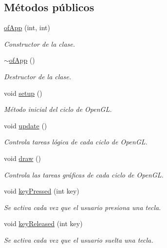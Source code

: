 \subsection*{Métodos públicos}
\begin{DoxyCompactItemize}
\item 
\hyperlink{classof_app_a8e51b68c569cf4839163fd7470d50260}{of\+App} (int, int)
\begin{DoxyCompactList}\small\item\em Constructor de la clase. \end{DoxyCompactList}\item 
\hyperlink{classof_app_a46d5e370034c47f5fc1a530bcb331c27}{$\sim$of\+App} ()
\begin{DoxyCompactList}\small\item\em Destructor de la clase. \end{DoxyCompactList}\item 
void \hyperlink{classof_app_af68eaa1366244f7a541cd08e02199c12}{setup} ()
\begin{DoxyCompactList}\small\item\em Método inicial del ciclo de Open\+G\+L. \end{DoxyCompactList}\item 
void \hyperlink{classof_app_afef41ea4aee5a22ea530afba33ae7a7b}{update} ()
\begin{DoxyCompactList}\small\item\em Controla tareas lógica de cada ciclo de Open\+G\+L. \end{DoxyCompactList}\item 
void \hyperlink{classof_app_a75dd45437b9e317db73d8daef1ad49f8}{draw} ()
\begin{DoxyCompactList}\small\item\em Controla las tareas gráficas de cada ciclo de Open\+G\+L. \end{DoxyCompactList}\item 
void \hyperlink{classof_app_a957d3197364bbac8e67eaa4f15b28ad3}{key\+Pressed} (int key)
\begin{DoxyCompactList}\small\item\em Se activa cada vez que el usuario presiona una tecla. \end{DoxyCompactList}\item 
void \hyperlink{classof_app_aa1503a87453bcfdd395fe4acca5d91a0}{key\+Released} (int key)
\begin{DoxyCompactList}\small\item\em Se activa cada vez que el usuario suelta una tecla. \end{DoxyCompactList}\item 

\end{DoxyCompactItemize}
